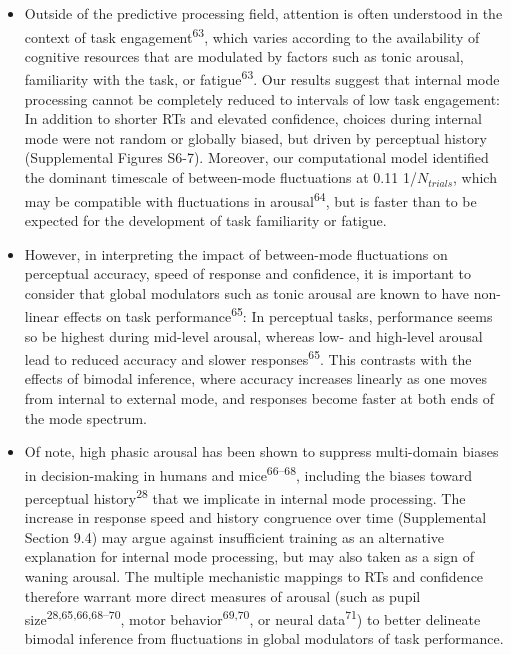 \documentclass[
]{article}
\begin{document}
\begin{itemize}
\item
  Outside of the predictive processing field, attention is often
  understood in the context of task engagement\textsuperscript{63},
  which varies according to the availability of cognitive resources that
  are modulated by factors such as tonic arousal, familiarity with the
  task, or fatigue\textsuperscript{63}. Our results suggest that
  internal mode processing cannot be completely reduced to intervals of
  low task engagement: In addition to shorter RTs and elevated
  confidence, choices during internal mode were not random or globally
  biased, but driven by perceptual history (Supplemental Figures S6-7).
  Moreover, our computational model identified the dominant timescale of
  between-mode fluctuations at 0.11 1/\(N_{trials}\), which may be
  compatible with fluctuations in arousal\textsuperscript{64}, but is
  faster than to be expected for the development of task familiarity or
  fatigue.
\item
  However, in interpreting the impact of between-mode fluctuations on
  perceptual accuracy, speed of response and confidence, it is important
  to consider that global modulators such as tonic arousal are known to
  have non-linear effects on task performance\textsuperscript{65}: In
  perceptual tasks, performance seems so be highest during mid-level
  arousal, whereas low- and high-level arousal lead to reduced accuracy
  and slower responses\textsuperscript{65}. This contrasts with the
  effects of bimodal inference, where accuracy increases linearly as one
  moves from internal to external mode, and responses become faster at
  both ends of the mode spectrum.
\item
  Of note, high phasic arousal has been shown to suppress multi-domain
  biases in decision-making in humans and mice\textsuperscript{66--68},
  including the biases toward perceptual history\textsuperscript{28}
  that we implicate in internal mode processing. The increase in
  response speed and history congruence over time (Supplemental Section
  9.4) may argue against insufficient training as an alternative
  explanation for internal mode processing, but may also taken as a sign
  of waning arousal. The multiple mechanistic mappings to RTs and
  confidence therefore warrant more direct measures of arousal (such as
  pupil size\textsuperscript{28,65,66,68--70}, motor
  behavior\textsuperscript{69,70}, or neural data\textsuperscript{71})
  to better delineate bimodal inference from fluctuations in global
  modulators of task performance.
\end{itemize}
\end{document}
